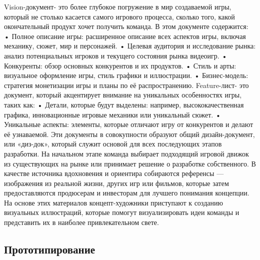     Vision-документ- это более глубокое погружение в мир создаваемой игры, который не столько касается самого игрового процесса, сколько того, какой окончательный продукт хочет получить команда. В этом документе содержится:\newline
    • Полное описание игры: расширенное описание всех аспектов игры, включая механику, сюжет, мир и персонажей.
    \newline
    • Целевая аудитория и исследование рынка: анализ потенциальных игроков и текущего состояния рынка видеоигр.
    \newline
    • Конкуренты: обзор основных конкурентов и их продуктов.
    \newline
    • Стиль и арты: визуальное оформление игры, стиль графики и иллюстрации.
    \newline
    • Бизнес-модель: стратегия монетизации игры и планы по её распространению.
    \newline
    Feature-лист- это документ, который акцентирует внимание на уникальных особенностях игры, таких как:
    \newline
    • Детали, которые будут выделены: например, высококачественная графика, инновационные игровые механики или уникальный сюжет.
    \newline
    • Уникальные аспекты: элементы, которые отличают игру от конкурентов и делают её узнаваемой.
    \newline
Эти документы в совокупности образуют общий дизайн-документ, или «диз-док», который служит основой для всех последующих этапов разработки. На начальном этапе команда выбирает подходящий игровой движок из существующих на рынке или принимает решение о разработке собственного. В качестве источника вдохновения и ориентира собираются референсы — изображения из реальной жизни, других игр или фильмов, которые затем предоставляются продюсерам и инвесторам для лучшего понимания концепции. На основе этих материалов концепт-художники приступают к созданию визуальных иллюстраций, которые помогут визуализировать идеи команды и представить их в наиболее привлекательном свете.


\subsection{Прототипирование}

